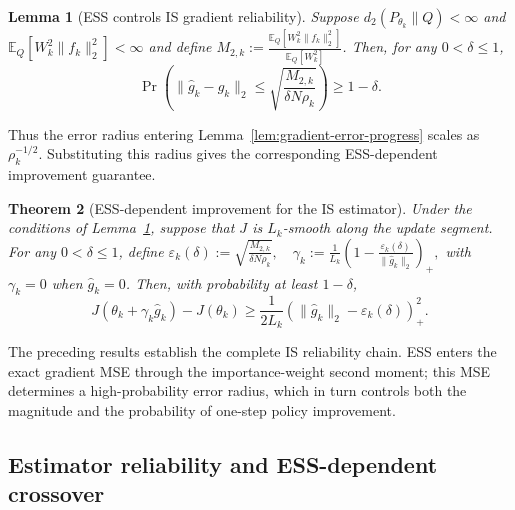 \documentclass[11pt]{article}
\newtheorem{theorem}{Theorem}
\newtheorem{lemma}[theorem]{Lemma}
\theoremstyle{remark}
\newcommand{\E}{\mathbb{E}}
\begin{document}
\begin{lemma}[ESS controls IS gradient reliability]
\label{lem:rho-gradient-reliability}
Suppose $d_2(P_{\theta_k}\|Q)<\infty$ and
$\E_Q[W_k^2\|f_k\|_2^2]<\infty$ and define $M_{2,k}:=\frac{\E_Q[W_k^2\|f_k\|_2^2]}{\E_Q[W_k^2]}$. Then, for any $0<\delta\le1$,
\begin{equation}
 \Pr\left(
 \|\widehat g_k-g_k\|_2
 \le
 \sqrt{\frac{M_{2,k}}{\delta N\rho_k}}
 \right)
 \ge
 1-\delta .
 \label{eq:rho-gradient-concentration}
\end{equation}
\end{lemma}

Thus the error radius entering
Lemma~\ref{lem:gradient-error-progress} scales as
$\rho_k^{-1/2}$. Substituting this radius gives the corresponding ESS-dependent improvement guarantee.

\begin{theorem}[ESS-dependent improvement for the IS estimator]
\label{thm:permissive-reliability}
Under the conditions of Lemma~\ref{lem:rho-gradient-reliability}, suppose that
$J$ is $L_k$-smooth along the update segment. For any $0<\delta\le1$, define $\varepsilon_k(\delta)
 :=
 \sqrt{\frac{M_{2,k}}{\delta N\rho_k}},
 \quad
 \gamma_k
 :=
 \frac1{L_k}
 \left(
 1-\frac{\varepsilon_k(\delta)}
        {\|\widehat g_k\|_2}
 \right)_+ ,$ with $\gamma_k=0$ when $\widehat g_k=0$. Then, with probability at least
$1-\delta$,
\begin{equation}
 J(\theta_k+\gamma_k\widehat g_k)-J(\theta_k)
 \ge
 \frac{1}{2L_k}
 \left(
 \|\widehat g_k\|_2-\varepsilon_k(\delta)
 \right)_+^2 .
 \label{eq:permissive-reliability}
\end{equation}
\end{theorem}

The preceding results establish the complete IS reliability chain. ESS enters
the exact gradient MSE through the importance-weight second moment; this MSE
determines a high-probability error radius, which in turn controls both the
magnitude and the probability of one-step policy improvement. 

\subsection{Estimator reliability and ESS-dependent crossover}
\label{sec:clipping-recovery}
\end{document}
